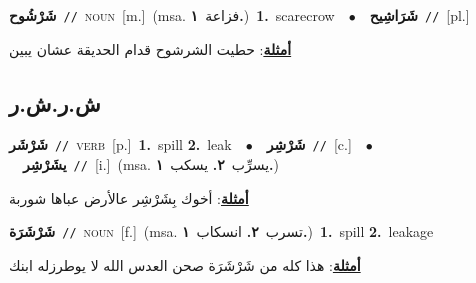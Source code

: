 \documentclass[10pt,a4paper,twoside]{article} %
\begin{document}
\begin{multicols}{2}
{\setlength\topsep{0pt}\textbf{\foreignlanguage{arabic}{شَرْشُوح}}\ {\color{gray}\texttt{//}\color{black}}\ \textsc{noun}\ [m.]\ \color{gray}(msa. \foreignlanguage{arabic}{فزاعة}~\foreignlanguage{arabic}{\textbf{١.}})\color{black}\ \textbf{1.}~scarecrow\ \ $\bullet$\ \ \setlength\topsep{0pt}\textbf{\foreignlanguage{arabic}{شَرَاشِيح}}\ {\color{gray}\texttt{//}\color{black}}\ [pl.]\  \begin{flushright}\color{gray}\foreignlanguage{arabic}{\textbf{\underline{\foreignlanguage{arabic}{أمثلة}}}: حطيت الشرشوح قدام الحديقة عشان يبين}\end{flushright}\color{black}} \vspace{2mm}

\vspace{-3mm}
\subsection*{\color{blue}\foreignlanguage{arabic}{ش.ر.ش.ر}\color{blue}{}} 

{\setlength\topsep{0pt}\textbf{\foreignlanguage{arabic}{شَرْشَر}}\ {\color{gray}\texttt{//}\color{black}}\ \textsc{verb}\ [p.]\ \textbf{1.}~spill  \textbf{2.}~leak\ \ $\bullet$\ \ \setlength\topsep{0pt}\textbf{\foreignlanguage{arabic}{شَرْشِر}}\ {\color{gray}\texttt{//}\color{black}}\ [c.]\ \ $\bullet$\ \ \setlength\topsep{0pt}\textbf{\foreignlanguage{arabic}{يشَرْشِر}}\ {\color{gray}\texttt{//}\color{black}}\ [i.]\ \color{gray}(msa. \foreignlanguage{arabic}{يسرِّب}~\foreignlanguage{arabic}{\textbf{٢.}}  \foreignlanguage{arabic}{يسكب}~\foreignlanguage{arabic}{\textbf{١.}})\color{black}\  \begin{flushright}\color{gray}\foreignlanguage{arabic}{\textbf{\underline{\foreignlanguage{arabic}{أمثلة}}}: أخوك بِشَرْشِر عالأرض عباها شوربة}\end{flushright}\color{black}} \vspace{2mm}

{\setlength\topsep{0pt}\textbf{\foreignlanguage{arabic}{شَرْشَرَة}}\ {\color{gray}\texttt{//}\color{black}}\ \textsc{noun}\ [f.]\ \color{gray}(msa. \foreignlanguage{arabic}{تسرب}~\foreignlanguage{arabic}{\textbf{٢.}}  \foreignlanguage{arabic}{انسكاب}~\foreignlanguage{arabic}{\textbf{١.}})\color{black}\ \textbf{1.}~spill  \textbf{2.}~leakage\  \begin{flushright}\color{gray}\foreignlanguage{arabic}{\textbf{\underline{\foreignlanguage{arabic}{أمثلة}}}: هذا كله من شَرْشَرَة صحن العدس الله لا يوطرزله ابنك}\end{flushright}\color{black}} \vspace{2mm}


\end{multicols}
\end{document}
